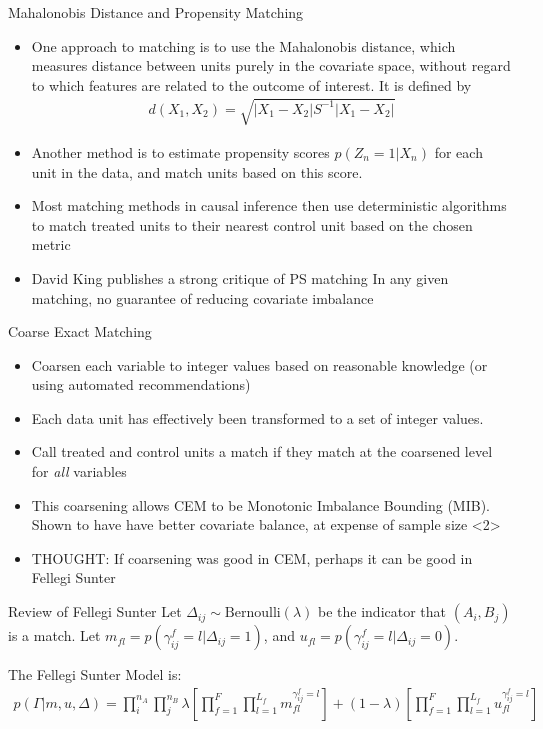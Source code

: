 \documentclass{beamer}
\begin{document}
\begin{frame}{Mahalonobis Distance and Propensity Matching}
	\begin{itemize}
		\item One approach to matching is to use the Mahalonobis distance, which measures distance between units purely in the covariate space, without regard to which features are related to the outcome of interest. It is defined by
		\begin{align*}
			d(X_1, X_2) = \sqrt{|X_1 - X_2| S^{-1} |X_1 - X_2|}
		\end{align*}
		\item Another method is to estimate propensity scores $p(Z_n = 1 |X_n)$ for each unit in the data, and match units based on this score.
		\item Most matching methods in causal inference then use deterministic algorithms to match treated units to their nearest control unit based on the chosen metric
		\item David King publishes a strong critique of PS matching In any given matching, no guarantee of reducing covariate imbalance
	\end{itemize}
\end{frame}

\begin{frame}{Coarse Exact Matching}
	\begin{itemize}
		\item Coarsen each variable to integer values based on reasonable knowledge (or using automated recommendations)
		\item Each data unit has effectively been transformed to a set of integer values. 
		\item Call treated and control units a match if they match at the coarsened level for \emph{all} variables
		\item This coarsening allows CEM to be Monotonic Imbalance Bounding (MIB). Shown to have have better covariate balance, at expense of sample size
		<2>\item THOUGHT: If coarsening was good in CEM, perhaps it can be good in Fellegi Sunter
	\end{itemize}
\end{frame}

\begin{frame}{Review of Fellegi Sunter}
	Let $\Delta_{ij} \sim \text{Bernoulli}(\lambda)$ be the indicator that  $(A_i, B_j)$ is a match. Let $m_{fl} = p(\gamma_{ij}^f = l | \Delta_{ij} = 1)$, and $u_{fl} = p(\gamma_{ij}^f = l | \Delta_{ij} = 0)$. \linebreak
	
	The Fellegi Sunter Model is:
	\begin{align*}
		p(\Gamma| m, u, \Delta) = \prod_{i}^{n_A} \prod_j^{n_B} \lambda\left[\prod_{f=1}^F \prod_{l = 1}^{L_f}m_{fl}^{\gamma_{ij}^f = l}\right]  + (1 - \lambda) \left[\prod_{f=1}^F \prod_{l = 1}^{L_f}u_{fl}^{\gamma_{ij}^f = l}\right] 
	\end{align*}
\end{frame}
\end{document}
